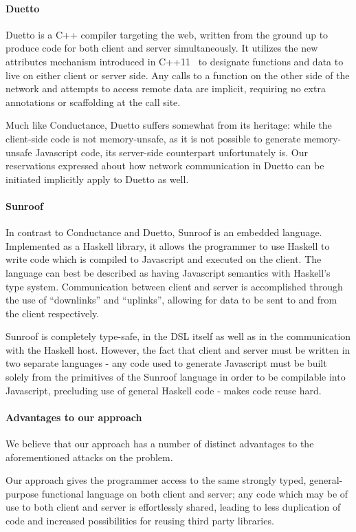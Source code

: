 \documentclass[preprint]{sigplanconf}
\begin{document}
\paragraph{Duetto} Duetto is a C++ compiler targeting the web, written from
the ground up to produce code for both client and server simultaneously. It
utilizes the new attributes mechanism introduced in C++11\ \cite{sepples11} to
designate functions and data to live on either client or server side. Any calls
to a function on the other side of the network and attempts to access remote
data are implicit, requiring no extra annotations or scaffolding at the call
site.

Much like Conductance, Duetto suffers somewhat from its heritage: while the
client-side code is not memory-unsafe, as it is not possible to generate
memory-unsafe Javascript code, its server-side counterpart unfortunately is.
Our reservations expressed about how network communication in Duetto can be
initiated implicitly apply to Duetto as well.

\paragraph{Sunroof} In contrast to Conductance and Duetto, Sunroof is an
embedded language. Implemented as a Haskell library, it allows the programmer
to use Haskell to write code which is compiled to Javascript and executed on
the client. The language can best be described as having Javascript semantics
with Haskell's type system. Communication between client and server is
accomplished through the use of ``downlinks'' and ``uplinks'', allowing for
data to be sent to and from the client respectively.

Sunroof is completely type-safe, in the DSL itself as well as in the
communication with the Haskell host. However, the fact that client and server
must be written in two separate languages - any code used to generate
Javascript must be built solely from the primitives of the Sunroof
language in order to be compilable into Javascript, precluding use of general
Haskell code - makes code reuse hard.

\paragraph{Advantages to our approach} We believe that our approach has a
number of distinct advantages to the aforementioned attacks on the problem.

Our approach gives the programmer access to the same strongly typed,
general-purpose functional language on both client and server; any code which
may be of use to both client and server is effortlessly shared, leading to less
duplication of code and increased possibilities for reusing third party
libraries.
\end{document}
